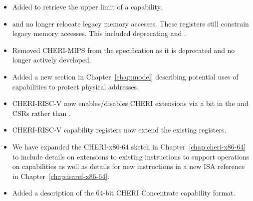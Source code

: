 \begin{itemize}
\item Added  to retrieve the upper limit of a
  capability.

\item \DDC{} and \PCC{} no longer relocate legacy memory accesses.
  These registers still constrain legacy memory accesses.  This
  included deprecating  and .

\item Removed CHERI-MIPS from the specification as it is deprecated
  and no longer actively developed.

\item Added a new section in Chapter~\ref{chap:model} describing
  potential uses of capabilities to protect physical addresses.

\item CHERI-RISC-V now enables/disables CHERI extensions via a bit in
  the \menvcfg{} and \senvcfg{} CSRs rather than \xccsr{}.

\item CHERI-RISC-V \xScratchC{} capability registers now extend the
  existing \xscratch{} registers.

\item We have expanded the CHERI-x86-64 sketch in
  Chapter~\ref{chap:cheri-x86-64} to include details on extensions to
  existing instructions to support operations on capabilities as well
  as details for new instructions in a new ISA reference in
  Chapter~\ref{chap:isaref-x86-64}.

\item Added a description of the 64-bit CHERI Concentrate capability
  format.
\end{itemize}
